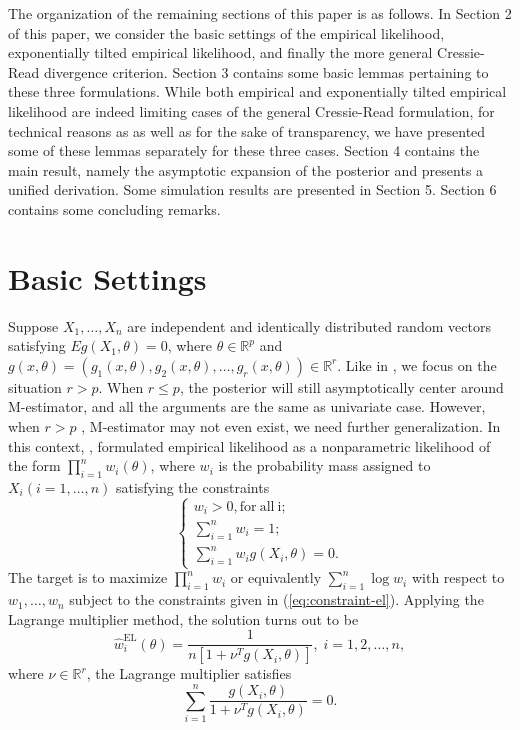 The organization of the remaining sections of this paper is as follows.
In Section 2 of this paper, we consider the basic settings of the
empirical likelihood, exponentially tilted empirical likelihood, and
finally the more general Cressie-Read divergence criterion. Section
3 contains some basic lemmas pertaining to these three formulations.
While both empirical and exponentially tilted empirical likelihood
are indeed limiting cases of the general Cressie-Read formulation,
for technical reasons as as well as for the sake of transparency,
we have presented some of these lemmas separately for these three
cases. Section 4 contains the main result, namely the asymptotic expansion
of the posterior and presents a unified derivation. Some simulation
results are presented in Section 5. Section 6 contains some concluding
remarks.


\section{Basic Settings}

Suppose $X_{1},\ldots,X_{n}$ are independent and identically distributed
random vectors satisfying $Eg\left(X_{1},\theta\right)=0$, where
$\theta\in\mathbb{R}^{p}$ and $g\left(x,\theta\right)=\left(g_{1}\left(x,\theta\right),g_{2}\left(x,\theta\right),\ldots,g_{r}\left(x,\theta\right)\right)\in\mathbb{R}^{r}$.
Like in \citet{qin1994empirical}, we focus on the situation $r>p$.
When $r\le p$, the posterior will still asymptotically center around
M-estimator, and all the arguments are the same as univariate case.
However, when $r>p$ , M-estimator may not even exist, we need further
generalization. In this context, \citet{owen1988empirical}, formulated
empirical likelihood as a nonparametric likelihood of the form $\prod_{i=1}^{n}w_{i}\left(\theta\right)$,
where $w_{i}$ is the probability mass assigned to $X_{i}\left(i=1,\ldots,n\right)$
satisfying the constraints 
\begin{equation}
\begin{cases}
w_{i}>0,\mathrm{for\: all\: i;}\\
\sum_{i=1}^{n}w_{i}=1;\\
\sum_{i=1}^{n}w_{i}g\left(X_{i},\theta\right)=0.
\end{cases}\label{eq:constraint-el}
\end{equation}
The target is to maximize $\prod_{i=1}^{n}w_{i}$ or equivalently
$\sum_{i=1}^{n}\log w_{i}$ with respect to $w_{1},\ldots,w_{n}$
subject to the constraints given in (\ref{eq:constraint-el}). Applying
the Lagrange multiplier method, the solution turns out to be 
\begin{equation}
\hat{w}_{i}^{\mathrm{EL}}\left(\theta\right)=\frac{1}{n\left[1+\nu^{T}g\left(X_{i},\theta\right)\right]},\; i=1,2,\ldots,n,\label{eq:sol-emp-lik}
\end{equation}
where $\nu\in\mathbb{R}^{r}$, the Lagrange multiplier satisfies 
\begin{equation}
\sum_{i=1}^{n}\frac{g\left(X_{i},\theta\right)}{1+\nu^{T}g\left(X_{i},\theta\right)}=0.\label{eq:lambda-eq}
\end{equation}


